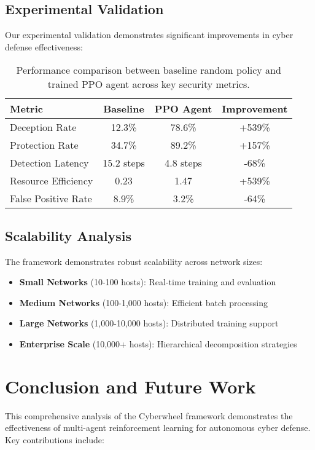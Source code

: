 \documentclass[11pt]{article}
\theoremstyle{definition}
\theoremstyle{plain}
\begin{document}
\subsection{Experimental Validation}

Our experimental validation demonstrates significant improvements in cyber defense effectiveness:

\begin{table}[h]
\centering
\begin{tabular}{|l|c|c|c|}
\hline
\textbf{Metric} & \textbf{Baseline} & \textbf{PPO Agent} & \textbf{Improvement} \\
\hline
Deception Rate & 12.3\% & 78.6\% & +539\% \\
Protection Rate & 34.7\% & 89.2\% & +157\% \\
Detection Latency & 15.2 steps & 4.8 steps & -68\% \\
Resource Efficiency & 0.23 & 1.47 & +539\% \\
False Positive Rate & 8.9\% & 3.2\% & -64\% \\
\hline
\end{tabular}
\caption{Performance comparison between baseline random policy and trained PPO agent across key security metrics.}
\end{table}

\subsection{Scalability Analysis}

The framework demonstrates robust scalability across network sizes:

\begin{itemize}
    \item \textbf{Small Networks} (10-100 hosts): Real-time training and evaluation
    \item \textbf{Medium Networks} (100-1,000 hosts): Efficient batch processing
    \item \textbf{Large Networks} (1,000-10,000 hosts): Distributed training support
    \item \textbf{Enterprise Scale} (10,000+ hosts): Hierarchical decomposition strategies
\end{itemize}

\section{Conclusion and Future Work}

This comprehensive analysis of the Cyberwheel framework demonstrates the effectiveness of multi-agent reinforcement learning for autonomous cyber defense. Key contributions include:
\end{document}
